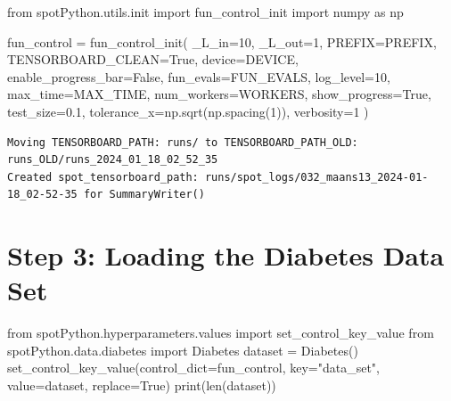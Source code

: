\documentclass[
  letterpaper,
  DIV=11,
  numbers=noendperiod]{scrreprt}
\newenvironment{Shaded}{\begin{snugshade}}{\end{snugshade}}
\newcommand{\BuiltInTok}[1]{\textcolor[rgb]{0.00,0.23,0.31}{#1}}
\newcommand{\DecValTok}[1]{\textcolor[rgb]{0.68,0.00,0.00}{#1}}
\newcommand{\FloatTok}[1]{\textcolor[rgb]{0.68,0.00,0.00}{#1}}
\newcommand{\ImportTok}[1]{\textcolor[rgb]{0.00,0.46,0.62}{#1}}
\newcommand{\NormalTok}[1]{\textcolor[rgb]{0.00,0.23,0.31}{#1}}
\newcommand{\OperatorTok}[1]{\textcolor[rgb]{0.37,0.37,0.37}{#1}}
\newcommand{\StringTok}[1]{\textcolor[rgb]{0.13,0.47,0.30}{#1}}
\newcommand{\VariableTok}[1]{\textcolor[rgb]{0.07,0.07,0.07}{#1}}
\begin{document}
\begin{Shaded}
\begin{Highlighting}[]
\ImportTok{from}\NormalTok{ spotPython.utils.init }\ImportTok{import}\NormalTok{ fun\_control\_init}
\ImportTok{import}\NormalTok{ numpy }\ImportTok{as}\NormalTok{ np}

\NormalTok{fun\_control }\OperatorTok{=}\NormalTok{ fun\_control\_init(}
\NormalTok{    \_L\_in}\OperatorTok{=}\DecValTok{10}\NormalTok{,}
\NormalTok{    \_L\_out}\OperatorTok{=}\DecValTok{1}\NormalTok{,}
\NormalTok{    PREFIX}\OperatorTok{=}\NormalTok{PREFIX,}
\NormalTok{    TENSORBOARD\_CLEAN}\OperatorTok{=}\VariableTok{True}\NormalTok{,}
\NormalTok{    device}\OperatorTok{=}\NormalTok{DEVICE,}
\NormalTok{    enable\_progress\_bar}\OperatorTok{=}\VariableTok{False}\NormalTok{,}
\NormalTok{    fun\_evals}\OperatorTok{=}\NormalTok{FUN\_EVALS,}
\NormalTok{    log\_level}\OperatorTok{=}\DecValTok{10}\NormalTok{,}
\NormalTok{    max\_time}\OperatorTok{=}\NormalTok{MAX\_TIME,}
\NormalTok{    num\_workers}\OperatorTok{=}\NormalTok{WORKERS,}
\NormalTok{    show\_progress}\OperatorTok{=}\VariableTok{True}\NormalTok{,}
\NormalTok{    test\_size}\OperatorTok{=}\FloatTok{0.1}\NormalTok{,}
\NormalTok{    tolerance\_x}\OperatorTok{=}\NormalTok{np.sqrt(np.spacing(}\DecValTok{1}\NormalTok{)),}
\NormalTok{    verbosity}\OperatorTok{=}\DecValTok{1}
\NormalTok{    )}
\end{Highlighting}
\end{Shaded}

\begin{verbatim}
Moving TENSORBOARD_PATH: runs/ to TENSORBOARD_PATH_OLD: runs_OLD/runs_2024_01_18_02_52_35
Created spot_tensorboard_path: runs/spot_logs/032_maans13_2024-01-18_02-52-35 for SummaryWriter()
\end{verbatim}

\section{Step 3: Loading the Diabetes Data
Set}\label{step-3-loading-the-diabetes-data-set-1}

\begin{Shaded}
\begin{Highlighting}[]
\ImportTok{from}\NormalTok{ spotPython.hyperparameters.values }\ImportTok{import}\NormalTok{ set\_control\_key\_value}
\ImportTok{from}\NormalTok{ spotPython.data.diabetes }\ImportTok{import}\NormalTok{ Diabetes}
\NormalTok{dataset }\OperatorTok{=}\NormalTok{ Diabetes()}
\NormalTok{set\_control\_key\_value(control\_dict}\OperatorTok{=}\NormalTok{fun\_control,}
\NormalTok{                        key}\OperatorTok{=}\StringTok{"data\_set"}\NormalTok{,}
\NormalTok{                        value}\OperatorTok{=}\NormalTok{dataset,}
\NormalTok{                        replace}\OperatorTok{=}\VariableTok{True}\NormalTok{)}
\BuiltInTok{print}\NormalTok{(}\BuiltInTok{len}\NormalTok{(dataset))}
\end{Highlighting}
\end{Shaded}
\end{document}
